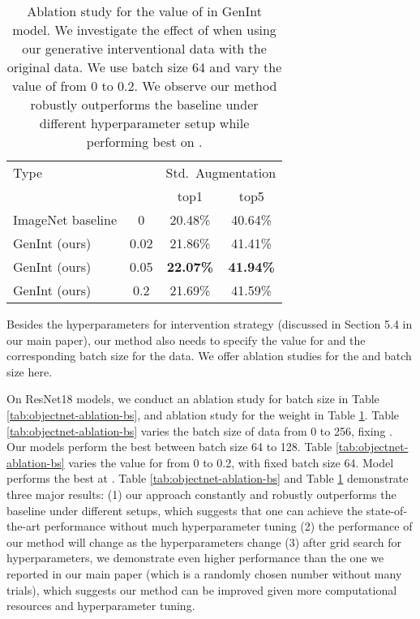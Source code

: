 \documentclass[final]{cvpr}
\begin{document}
\begin{subappendices}
\begin{table}[t]
\begin{center}
    \centering
    \begin{tabular}{lc|cc}
         \toprule
          Type &  &  \multicolumn{2}{c}{Std.\ Augmentation}  \\
          &  & top1   & top5 \\
         \midrule  
ImageNet baseline \cite{He_2016} & 0 & 20.48\% & 40.64\% \\
          \midrule
          GenInt (ours) & 0.02 & 21.86\% & 41.41\% \\
          GenInt (ours) & 0.05 & \textbf{22.07\% }& \textbf{41.94\%} \\
          GenInt (ours) & 0.2 & 21.69\% & 41.59\% \\
         \bottomrule
    \end{tabular}
\end{center}
\caption{Ablation study for the value of  in GenInt model. We investigate the effect of  when using our generative interventional data with the original data. We use batch size 64 and vary the value of  from 0 to 0.2. We observe our method robustly outperforms the baseline under different hyperparameter setup while performing best on .}  
\label{tab:objectnet-ablation-lam}
\end{table}

Besides the hyperparameters for intervention strategy (discussed in Section 5.4 in our main paper), our method also needs to specify the value for  and the corresponding batch size for the data. We offer ablation studies for the  and batch size here.

On ResNet18 models, we conduct an ablation study for batch size in Table \ref{tab:objectnet-ablation-bs}, and ablation study for the weight  in Table \ref{tab:objectnet-ablation-lam}.
Table \ref{tab:objectnet-ablation-bs} varies the batch size of  data from 0 to 256, fixing . Our models perform the best between batch size 64 to 128. Table \ref{tab:objectnet-ablation-bs} varies the value for  from 0 to 0.2, with fixed batch size 64. Model performs the best at .
Table \ref{tab:objectnet-ablation-bs} and Table \ref{tab:objectnet-ablation-lam} demonstrate three major results: (1) our approach constantly and robustly outperforms the baseline under different setups, which suggests that one can achieve the state-of-the-art performance without much hyperparameter tuning  (2) the performance of our method will change as the hyperparameters change (3) after grid search for hyperparameters, we demonstrate even higher performance than the one we reported in our main paper (which is a randomly chosen number without many trials), which suggests our method can be improved given more computational resources and hyperparameter tuning.
 


\end{subappendices}
\end{document}
